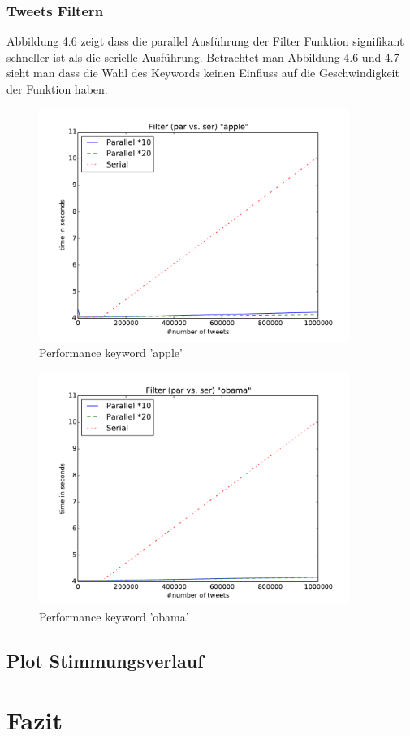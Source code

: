 \documentclass[12pt, oneside]{report}   	%
\begin{document}
\subsection{Tweets Filtern}
Abbildung 4.6  zeigt dass die parallel Ausführung der Filter Funktion signifikant schneller ist als die serielle Ausführung. Betrachtet man Abbildung 4.6 und 4.7 sieht man dass die Wahl des Keywords keinen Einfluss auf die Geschwindigkeit der Funktion haben.
\begin{figure}[htbp]
\begin{center}
\includegraphics[width=0.9\textwidth]{bilder/time_filter_apple.pdf}
\caption{Performance keyword 'apple'}
\label{img:performancefilter1}
\end{center}
\end{figure}

\begin{figure}[htbp]
\begin{center}
\includegraphics[width=0.9\textwidth]{bilder/time_filter_obama.pdf}
\caption{Performance keyword 'obama'}
\label{img:performancefilter3}
\end{center}
\end{figure}


\section{Plot Stimmungsverlauf}


\chapter{Fazit}
\end{document}

